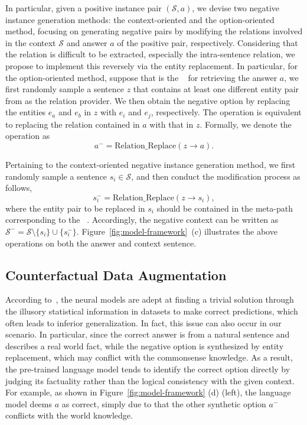 In particular, given a positive instance pair $(\mathcal{S}, a)$, we devise two negative instance generation methods: the context-oriented and the option-oriented method, focusing on generating negative pairs by modifying the relations involved in the context $\mathcal{S}$ and answer $a$ of the positive pair, respectively.
Considering that the relation is difficult to be extracted, especially the intra-sentence relation,
we propose to implement this reversely via the entity replacement.
In particular, for the option-oriented method, suppose that  is the \ntgtentp~ for retrieving the answer $a$, we first randomly sample a sentence $z$ that contains at least one different entity pair  from  as the relation provider. 
We then obtain the negative option by replacing the entities $e_a$ and $e_b$ in $z$ with $e_i$ and $e_j$, respectively.
The operation is equivalent to replacing the relation contained in $a$ with that in $z$. Formally, we denote the operation as 
$$
a^-=\mathrm{Relation\_Replace}(z\to a).
$$

Pertaining to the context-oriented negative instance generation method, we first 
randomly sample a sentence $s_i\in\mathcal{S}$, and then conduct the modification process as follows,
$$
s_i^-=\mathrm{Relation\_Replace}(z\to s_i),
$$
where the entity pair to be replaced in $s_i$ should be contained in the meta-path corresponding to the \ntgtentp~.
Accordingly, the negative context can be written as $\mathcal{S}^-=\mathcal{S}\setminus\{s_i\}\cup\{s_i^-\}$.
Figure~\ref{fig:model-framework}~(c) illustrates the above operations on both the answer and context sentence.


















\subsection{Counterfactual Data Augmentation}
\label{sec:method:counterfactual}

According to~\citet{position-bias-2020-ko,sigir-bias,shortcut-mrc-2021-lai,tip-bias}, the neural models are adept at finding a trivial solution through the illusory statistical information in datasets to make correct predictions,
which often leads to inferior generalization.
In fact, this issue can also occur in our scenario.
In particular, since the correct answer is from a natural sentence and describes a real world fact, while the negative option is synthesized by entity replacement, which may conflict with the commonsense knowledge.
As a result, the pre-trained language model tends to identify the correct option directly by judging its factuality rather than the logical consistency with the given context.
For example, as shown in Figure~\ref{fig:model-framework} (d) (left), 
the language model deems $a$ as correct, simply due to that the other synthetic option $a^-$ conflicts with the world knowledge.


